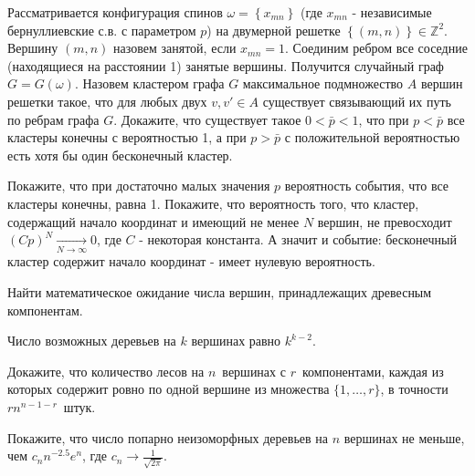 \begin{problem} 
Рассматривается конфигурация спинов $\omega =\left\{x_{mn} \right\}$ (где $x_{mn} $ - независимые бернуллиевские с.в. с параметром $p$) на двумерной решетке $\left\{(m,n)\right\}\in {\mathbb Z}^{2} $. Вершину $(m,n)$ назовем занятой, если $x_{mn} =1$. Соединим ребром все соседние (находящиеся на расстоянии 1) занятые вершины. Получится случайный граф $G=G\left(\omega \right)$. Назовем кластером графа $G$ максимальное подмножество $A$ вершин решетки такое, что для любых двух $v,v'\in A$ существует связывающий их путь по ребрам графа $G$. Докажите, что существует такое $0<\bar{p}<1$, что при $p<\bar{p}$ все кластеры конечны с вероятностью 1, а при $p>\bar{p}$ с положительной вероятностью есть хотя бы один бесконечный кластер.


\begin{ordre}
Покажите, что при достаточно малых значения $p$ вероятность события, что все кластеры конечны, равна 1. Покажите, что вероятность того, что кластер, содержащий начало координат и имеющий не менее $N$ вершин, не превосходит $\left(Cp\right)^{N} \mathop{\to }\limits_{N\to \infty } 0$, где $C$ - некоторая константа. А значит и событие: бесконечный кластер содержит начало координат - имеет нулевую вероятность.
\end{ordre}

\end{problem}


\begin{problem}
Найти математическое ожидание числа вершин, принадлежащих древесным компонентам.
\begin{ordre}
Число возможных деревьев на $k$ вершинах равно $k^{k-2}$. 
\end{ordre}
\end{problem}

\begin{problem}
Докажите, что количество лесов на $n$~вершинах с $r$~компонентами, каждая из которых содержит ровно по одной вершине из множества $ \{1, \ldots, r\} $, в точности $rn^{n-1-r}$~штук.
\end{problem}

\begin{problem}
Покажите, что число попарно неизоморфных деревьев на $n$ вершинах не меньше, чем $ c_n n^{-2.5} e^n $, где $ c_n \to \frac{1}{\sqrt{2\pi}}$.
\end{problem}
